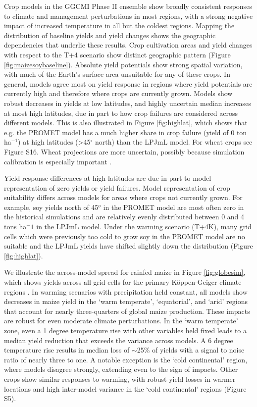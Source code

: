 \documentclass[gmd, manuscript]{copernicus} %
\begin{document}
{Crop models in the GGCMI Phase II ensemble show broadly consistent responses to climate and management perturbations in most regions, with a strong negative impact of increased temperature in all but the coldest regions. 
Mapping the distribution of baseline yields and yield changes shows the geographic dependencies that underlie these results. Crop cultivation areas and yield changes with respect to the T+4 scenario show distinct geographic pattern (Figure \ref{fig:maizesoybaseline}). 
Absolute yield potentials show strong spatial variation, with much of the Earth's surface area unsuitable for any of these crops. 
In general, models agree most on yield response in regions where yield potentials are currently high and therefore where crops are currently grown. 
Models show robust decreases in yields at low latitudes, and highly uncertain median increases at most high latitudes, due in part to how crop failures are considered across different models. 
This is also illustrated in Figure \ref{fig:highlat}, which shows that e.g. the PROMET model has a much higher share in crop failure (yield of 0 ton ha$^{-1}$) at high latitudes (>45$^\circ$ north) than the LPJmL model.
For wheat crops see Figure S16.
Wheat projections are more uncertain, possibly because simulation calibration is especially important \citep[e.g.][]{Asseng2013}.

Yield response differences at high latitudes are due in part to model representation of zero yields or yield failures. Model representation of crop suitability differs across models for areas where crops not currently grown. For example, soy yields north of 45$^o$ in the PROMET model are most often zero in the historical simulations and are relatively evenly distributed between 0 and 4 tons ha$^-1$ in the LPJmL model. Under the warming scenario (T+4K), many grid cells which were previously too cold to grow soy in the PROMET model are no suitable and the LPJmL yields have shifted slightly down the distribution (Figure \ref{fig:highlat}).

We illustrate the across-model spread for rainfed maize in Figure \ref{fig:globesim}, which shows yields across all grid cells for the primary K\"{o}ppen-Geiger climate regions \citep{rubel2010}. 
In warming scenarios with precipitation held constant, all models show decreases in maize yield in the `warm temperate', `equatorial', and `arid' regions that account for nearly three-quarters of global maize production. 
These impacts are robust for even moderate climate perturbations. 
In the `warm temperate' zone, even a 1 degree temperature rise with other variables held fixed leads to a median yield reduction that exceeds the variance across models. 
A 6 degree temperature rise results in median loss of $\sim$25\% of yields with a signal to noise ratio of nearly three to one. A notable exception is the `cold continental' region, where models disagree strongly, extending even to the sign of impacts. 
Other crops show similar responses to warming, with robust yield losses in warmer locations and high inter-model variance in the `cold continental' regions (Figure S5).

}
\end{document}
